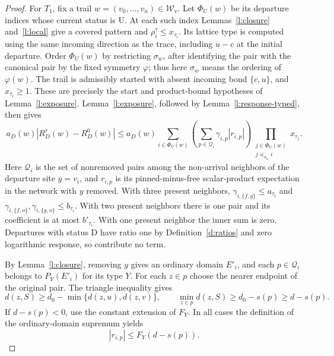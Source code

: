 \begin{proof}
For \(T_1\), fix a trail \(w=(v_0,\ldots,v_n)\in\mathcal W_v\).
Let \(\Phi_U(w)\) be its departure indices whose current status
is \(\mathrm U\).  At each such index Lemmas~\ref{l:closure}
and~\ref{l:local} give a covered pattern and
\(\rho_i^\tau\le x_{\tau_i}\).  Its lattice type is computed
using the same incoming direction as the trace, including
\(u-c\) at the initial departure.  Order \(\Phi_U(w)\) by
restricting \(\sigma_w\), after identifying the pair with the
canonical pair by the fixed symmetry \(\varphi\); thus here
\(\sigma_w\) means the ordering of \(\varphi(w)\).
The trail is admissibly started with absent incoming bond
\(\{c,u\}\), and \(x_{\tau_i}\ge1\).  These are precisely the
start and product-bound hypotheses of Lemma~\ref{l:exposure}.
Lemma~\ref{l:exposure}, followed by Lemma~\ref{l:response-typed},
then gives
\begin{equation}\label{e:rec-exposed}
 a_D(w)|R_D^\tau(w)-R_D^0(w)|
 \le a_D(w)\sum_{i\in\Phi_U(w)}
       \left(\sum_{p\in\mathcal Q_i}\gamma_{i,p}|r_{i,p}|\right)
       \prod_{\substack{j\in\Phi_U(w)\\j\preceq_{\sigma_w}i}}
                           x_{\tau_j}.
\end{equation}
Here \(\mathcal Q_i\) is the set of nonremoved pairs among
the non-arrival neighbors of the departure site \(y=v_i\),
and \(r_{i,p}\) is its pinned-minus-free scalar-product
expectation in the network with \(y\) removed.  With three
present neighbors, \(\gamma_{i,\{f,g\}}\le a_{\tau_i}\) and
\(\gamma_{i,\{f,o\}},\gamma_{i,\{g,o\}}\le b_{\tau_i}\).
With two present neighbors there is one pair and its coefficient
is at most \(b'_{\tau_i}\).  With one present neighbor the
inner sum is zero.  Departures with status \(\mathrm D\) have
ratio one by Definition~\ref{d:ratios} and zero logarithmic
response, so contribute no term.

By Lemma~\ref{l:closure}, removing \(y\) gives an ordinary
domain \(E'_i\), and each \(p\in\mathcal Q_i\) belongs to
\(P_Y(E'_i)\) for its type \(Y\).  For each \(z\in p\)
choose the nearer endpoint of the original pair.  The triangle
inequality gives
\[
 d(z,S)\ge d_0-\min\{d(z,u),d(z,v)\},\qquad
 \min_{z\in p}d(z,S)\ge d_0-s(p)\ge d-s(p).
\]
If \(d-s(p)<0\), use the constant extension of \(F_Y\).
In all cases the definition of the ordinary-domain supremum yields
\begin{equation}\label{e:rec-pair-envelope}
 |r_{i,p}|\le F_Y(d-s(p)).
\end{equation}


\end{proof}
